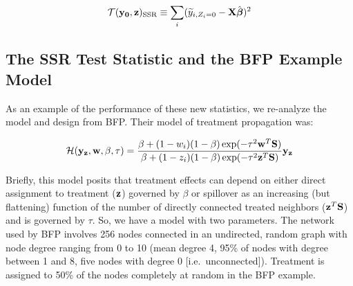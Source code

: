 \begin{equation}
 \mathcal{T}(\mathbf{y}_{\mathbf{0}},\mathbf{z})_{\text{SSR}} \equiv \sum_{i} ( \widetilde y_{i,Z_i=0} - \mathbf{X}\hat{\boldsymbol{\beta}} )^2 \label{eq:ssr}
\end{equation}


\subsection{The SSR Test Statistic and the BFP Example Model}

As an example of the performance of these new statistics, we re-analyze the
model and design from BFP. Their model of treatment propagation
was:

\begin{equation}
\mathcal{H}(\mathbf{y}_{\mathbf{z}}, \mathbf{w}, \beta, \tau) =
 \frac{\beta + (1 - w_i) (1 - \beta) \exp(- \tau^2 \mathbf{w}^{T} \mathbf{S})}
      {\beta + (1 - z_i) (1 - \beta) \exp(- \tau^2 \mathbf{z}^{T} \mathbf{S})} \mathbf{y}_{\mathbf{z}}
\label{eq:spillovermodelA}
\end{equation}

Briefly, this model posits that treatment effects can depend on either direct
assignment to treatment ($\mathbf{z}$) governed by $\beta$ or spillover as an
increasing (but flattening) function of the number of directly connected
treated neighbors ($\mathbf{z}^{T} \mathbf{S}$) and is governed by $\tau$. So, we have a
model with two parameters. The network used by BFP involves 256 nodes
connected in an undirected, random graph with node degree ranging from 0 to 10
(mean degree 4, 95\% of nodes with degree between 1 and 8, five nodes with
degree 0 [i.e.\ unconnected]).  Treatment is assigned to 50\% of the nodes 
completely at random in the BFP example.

